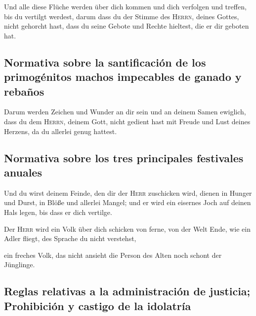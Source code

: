  Und alle diese Flüche werden über dich kommen und dich
verfolgen und treffen, bis du vertilgt werdest, darum dass du der Stimme
des \textsc{Herrn}, deines Gottes, nicht gehorcht hast, dass du seine
Gebote und Rechte hieltest, die er dir geboten hat.

\hypertarget{normativa-sobre-la-santificaciuxf3n-de-los-primoguxe9nitos-machos-impecables-de-ganado-y-rebauxf1os}{%
\subsection{Normativa sobre la santificación de los primogénitos machos
impecables de ganado y
rebaños}\label{normativa-sobre-la-santificaciuxf3n-de-los-primoguxe9nitos-machos-impecables-de-ganado-y-rebauxf1os}}

 Darum werden Zeichen und Wunder an dir sein und an
deinem Samen ewiglich,  dass du dem \textsc{Herrn},
deinem Gott, nicht gedient hast mit Freude und Lust deines Herzens, da
du allerlei genug hattest.

\hypertarget{normativa-sobre-los-tres-principales-festivales-anuales}{%
\subsection{Normativa sobre los tres principales festivales
anuales}\label{normativa-sobre-los-tres-principales-festivales-anuales}}

 Und du wirst deinem Feinde, den dir der \textsc{Herr}
zuschicken wird, dienen in Hunger und Durst, in Blöße und allerlei
Mangel; und er wird ein eisernes Joch auf deinen Hals legen, bis dass er
dich vertilge.

 Der \textsc{Herr} wird ein Volk über dich schicken von
ferne, von der Welt Ende, wie ein Adler fliegt, des Sprache du nicht
verstehst,

 ein freches Volk, das nicht ansieht die Person des Alten
noch schont der Jünglinge.

\hypertarget{reglas-relativas-a-la-administraciuxf3n-de-justicia-prohibiciuxf3n-y-castigo-de-la-idolatruxeda}{%
\subsection{Reglas relativas a la administración de justicia;
Prohibición y castigo de la
idolatría}\label{reglas-relativas-a-la-administraciuxf3n-de-justicia-prohibiciuxf3n-y-castigo-de-la-idolatruxeda}}


